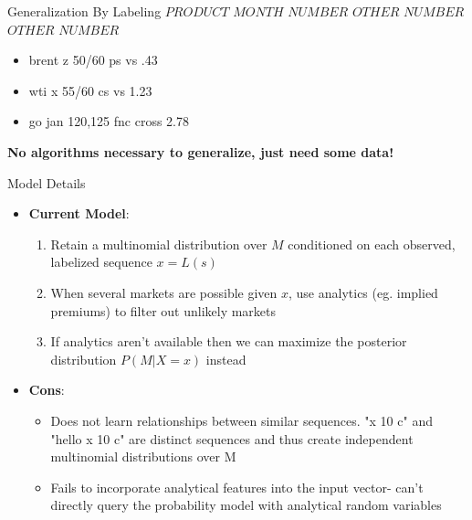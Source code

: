 \begin{frame}{Generalization By Labeling}
$PRODUCT$ $MONTH$ $NUMBER$ $OTHER$ $NUMBER$ $OTHER$ $NUMBER$\newline
\begin{itemize}
\pause
\item brent z 50/60 ps vs .43
\item wti x 55/60 cs vs 1.23
\item go jan 120,125 fnc cross 2.78\newline\newline
\pause
\end{itemize}
\textbf{No algorithms necessary to generalize, just need some data!}
\end{frame}

\begin{frame}{Model Details}

\begin{itemize}
\item \textbf{Current Model}:
\begin{enumerate}
 \item Retain a multinomial distribution over $M$ conditioned on each observed, labelized sequence $x = L(s)$
 \item When several markets are possible given $x$, use analytics (eg. implied premiums) to filter out unlikely markets
 \item If analytics aren't available then we can maximize the posterior distribution $P(M|X=x)$ instead
\end{enumerate}
\pause
\item \textbf{Cons}:
\begin{itemize}
\item Does not learn relationships between similar sequences. "x 10 c" and "hello x 10 c" are distinct sequences and thus create independent multinomial distributions over M
\item Fails to incorporate analytical features into the input vector- can't directly query the probability model with analytical random variables
\end{itemize}
\end{itemize}
\end{frame}

